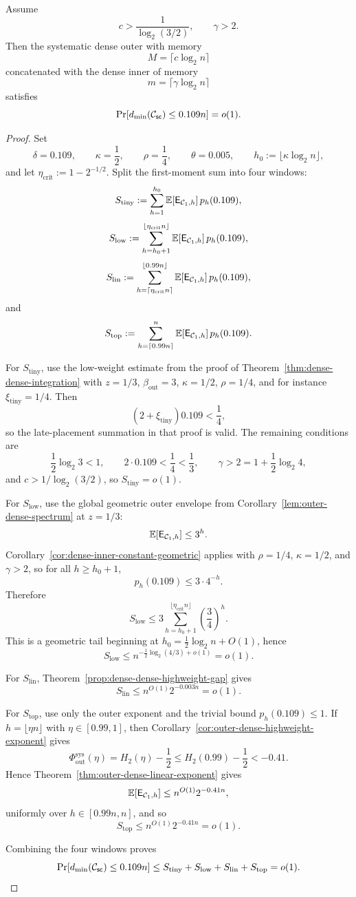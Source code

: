 \begin{theorem}
\label{thm:dense-dense-explicit-constant}
Assume
\[
c>\frac{1}{\log_2(3/2)},
\qquad
\gamma>2.
\]
Then the systematic dense outer with memory
\[
M=\lceil c\log_2 n\rceil
\]
concatenated with the dense inner of memory
\[
m=\lceil \gamma\log_2 n\rceil
\]
satisfies
\[
\Pr[d_{\min}({\mathcal{C}_{\mathsf{sc}}})\le 0.109 n]=o(1).
\]
\end{theorem}

\begin{proof}
Set
\[
\delta=0.109,
\qquad
\kappa=\frac12,
\qquad
\rho=\frac14,
\qquad
\theta=0.005,
\qquad
h_0:=\lfloor \kappa\log_2 n\rfloor,
\]
and let \(\eta_{\mathrm{crit}}:=1-2^{-1/2}\).
Split the first-moment sum into four windows:
\[
S_{\mathrm{tiny}}
:=
\sum_{h=1}^{h_0}\mathbb{E}[\mathsf{E}_{{\mathcal{C}_1},h}]\,p_h(0.109),
\]
\[
S_{\mathrm{low}}
:=
\sum_{h=h_0+1}^{\lfloor \eta_{\mathrm{crit}}n\rfloor}\mathbb{E}[\mathsf{E}_{{\mathcal{C}_1},h}]\,p_h(0.109),
\]
\[
S_{\mathrm{lin}}
:=
\sum_{h=\lceil \eta_{\mathrm{crit}}n\rceil}^{\lfloor 0.99n\rfloor}\mathbb{E}[\mathsf{E}_{{\mathcal{C}_1},h}]\,p_h(0.109),
\]
and
\[
S_{\mathrm{top}}
:=
\sum_{h=\lceil 0.99n\rceil}^{n}\mathbb{E}[\mathsf{E}_{{\mathcal{C}_1},h}]\,p_h(0.109).
\]

For \(S_{\mathrm{tiny}}\), use the low-weight estimate from the proof of
Theorem~\ref{thm:dense-dense-integration} with \(z=1/3\), \(\beta_{\mathrm{out}}=3\), \(\kappa=1/2\),
\(\rho=1/4\), and for instance \(\xi_{\mathrm{tiny}}=1/4\).  Then
\[
(2+\xi_{\mathrm{tiny}})0.109<\frac14,
\]
so the late-placement summation in that proof is valid.  The remaining
conditions are
\[
\frac12\log_2 3<1,
\qquad
2\cdot0.109<\frac14<\frac13,
\qquad
\gamma>2=1+\frac12\log_2 4,
\]
and \(c>1/\log_2(3/2)\), so \(S_{\mathrm{tiny}}=o(1)\).

For \(S_{\mathrm{low}}\), use the global geometric outer envelope from
Corollary~\ref{lem:outer-dense-spectrum} at \(z=1/3\):
\[
\mathbb{E}[\mathsf{E}_{{\mathcal{C}_1},h}]\le 3^h .
\]
Corollary~\ref{cor:dense-inner-constant-geometric} applies with \(\rho=1/4\), \(\kappa=1/2\), and \(\gamma>2\),
so for all \(h\ge h_0+1\),
\[
p_h(0.109)\le 3\cdot 4^{-h}.
\]
Therefore
\[
S_{\mathrm{low}}
\le
3\sum_{h=h_0+1}^{\lfloor \eta_{\mathrm{crit}}n\rfloor}
\left(\frac34\right)^h.
\]
This is a geometric tail beginning at \(h_0=\tfrac12\log_2 n+O(1)\), hence
\[
S_{\mathrm{low}}
\le
n^{-\frac12\log_2(4/3)+o(1)}
=
o(1).
\]

For \(S_{\mathrm{lin}}\), Theorem~\ref{prop:dense-dense-highweight-gap} gives
\[
S_{\mathrm{lin}}\le n^{O(1)}2^{-0.003n}=o(1).
\]

For \(S_{\mathrm{top}}\), use only the outer exponent and the trivial bound \(p_h(0.109)\le 1\).
If \(h=\lfloor \eta n\rfloor\) with \(\eta\in[0.99,1]\), then Corollary~\ref{cor:outer-dense-highweight-exponent} gives
\[
\Phi_{\mathrm{out}}^{\mathrm{sys}}(\eta)=H_2(\eta)-\frac12
\le
H_2(0.99)-\frac12
< -0.41.
\]
Hence Theorem~\ref{thm:outer-dense-linear-exponent} gives
\[
\mathbb{E}[\mathsf{E}_{{\mathcal{C}_1},h}]
\le
n^{O(1)}2^{-0.41n},
\]
uniformly over \(h\in[0.99n,n]\), and so
\[
S_{\mathrm{top}}
\le
n^{O(1)}2^{-0.41n}
=
o(1).
\]

Combining the four windows proves
\[
\Pr[d_{\min}({\mathcal{C}_{\mathsf{sc}}})\le 0.109 n]
\le
S_{\mathrm{tiny}}+S_{\mathrm{low}}+S_{\mathrm{lin}}+S_{\mathrm{top}}
=
o(1).
\]
\end{proof}
